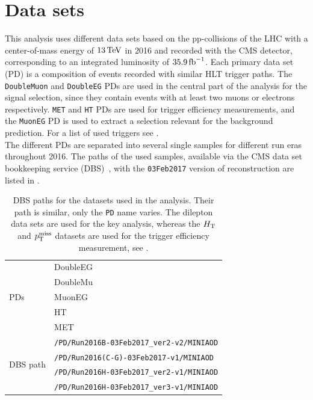 \section{Data sets}\label{sec:datasets}
This analysis uses different data sets based on the pp-collisions of the LHC with a center-of-mass energy of $13\,\text{Te\hspace{-.08em}V}$ in 2016 and recorded with the CMS detector, corresponding to an integrated luminosity of $35.9\mbox{\ensuremath{\,\text{fb}^\text{$-$1}}}$. Each primary data set (PD) is a composition of events recorded with similar HLT trigger paths. The \texttt{DoubleMuon} and \texttt{DoubleEG} PDs are used in the central part of the analysis for the signal selection, since they contain events with at least two muons or electrons respectively. \texttt{MET} and \texttt{HT} PDs are used for trigger efficiency measurements, and the \texttt{MuonEG} PD is used to extract a selection relevant for the background prediction. For a list of used triggers see .\\
The different PDs are separated into several single samples for different run eras throughout 2016. The paths of the used samples, available via the CMS data set bookkeeping service (DBS)~\cite{DASBookkeeping}, with the \texttt{03Feb2017} version of reconstruction are listed in .

\begin{table}[htb]
 \centering
 \caption{DBS paths for the datasets used in the analysis. Their path is similar, only the \texttt{PD} name varies. The dilepton data sets are used for the key analysis, whereas the $H_{\mathrm{T}}$ and $p_{\mathrm{T}}^\text{miss}$ datasets are used for the trigger efficiency measurement, see .}
 \label{tab:datasets}
 \begin{tabular}{l|l}
  \hline
  \multirow{5}{*}{PDs}       & DoubleEG               \\
                             & DoubleMu               \\
                             & MuonEG                 \\
                             & HT                     \\
                             & MET                    \\\hline\hline
  \multirow{ 4}{*}{DBS path} & \verb|/PD/Run2016B-03Feb2017_ver2-v2/MINIAOD| \\
                             & \verb|/PD/Run2016(C-G)-03Feb2017-v1/MINIAOD| \\
                             & \verb|/PD/Run2016H-03Feb2017_ver2-v1/MINIAOD| \\
                             & \verb|/PD/Run2016H-03Feb2017_ver3-v1/MINIAOD| \\
  \hline
 \end{tabular}
\end{table}


